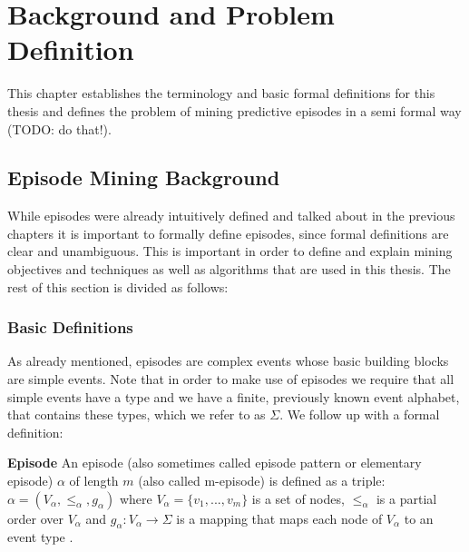 \chapter{Background and Problem Definition}
\label{chapter_background}

\ifpdf
    \graphicspath{{Chapter3/Figs/Raster/}{Chapter3/Figs/PDF/}{Chapter3/Figs/}}
\else
    \graphicspath{{Chapter3/Figs/Vector/}{Chapter3/Figs/}}
\fi

This chapter establishes the terminology and basic formal definitions for this thesis and defines the problem of mining predictive episodes in a semi formal way (TODO: do that!).

\section{Episode Mining Background}
\label{sec_episodeMiningBackground}

While episodes were already intuitively defined and talked about in the previous chapters it is important to formally define episodes, since formal definitions are clear and unambiguous. This is important in order to define and explain mining objectives and techniques as well as algorithms that are used in this thesis. The rest of this section is divided as follows: %

\subsection{Basic Definitions}
\label{subsec_basicEpisodeDefinitions}
As already mentioned, episodes are complex events whose basic building blocks are simple events. Note that  in order to make use of episodes we require that all simple events have a type and we have a finite, previously known event alphabet, that contains these types, which we refer to as $\Sigma$. We follow up with a formal definition:

\begin{mydef}
\label{def_episode}
\textbf{Episode} An episode (also sometimes called episode pattern or elementary episode) $\alpha$ of length $m$ (also called m-episode) is defined as a triple: $\alpha = (V_\alpha,{\leq}_{\alpha},g_\alpha)$ where $V_\alpha = \{v_1,...,v_m\}$ is a set of nodes, ${\leq}_{\alpha}$ is a partial order over $V_\alpha$ and $g_\alpha : V_\alpha \rightarrow \Sigma$ is a mapping that maps each node of $V_\alpha$ to an event type \cite{mannila1995discovering}.
\end{mydef}


